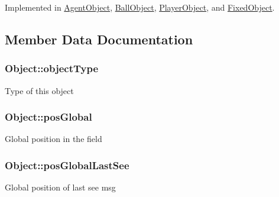 Implemented in \hyperlink{classAgentObject_a0043cea8d237828930412eb3c2b84e32}{Agent\+Object}, \hyperlink{classBallObject_a294d8fb34c88d98a1ef2ed2d1c864a62}{Ball\+Object}, \hyperlink{classPlayerObject_a01d587f88139dddf2ca1b39a65523dd6}{Player\+Object}, and \hyperlink{classFixedObject_ad8771b36cc2073d4a9fe1879b2f91d06}{Fixed\+Object}.



\subsection{Member Data Documentation}
\subsubsection[{\texorpdfstring{object\+Type}{objectType}}]{ Object\+::object\+Type\hspace{0.3cm}{\ttfamily [protected]}}\hypertarget{classObject_a1ecdca38441a375acbd102de3060b972}{}\label{classObject_a1ecdca38441a375acbd102de3060b972}
Type of this object 
\subsubsection[{\texorpdfstring{pos\+Global}{posGlobal}}]{ Object\+::pos\+Global\hspace{0.3cm}{\ttfamily [protected]}}\hypertarget{classObject_a7b1e09877ae916b49f64b9a9e9a3e0d1}{}\label{classObject_a7b1e09877ae916b49f64b9a9e9a3e0d1}
Global position in the field 
\subsubsection[{\texorpdfstring{pos\+Global\+Last\+See}{posGlobalLastSee}}]{ Object\+::pos\+Global\+Last\+See\hspace{0.3cm}{\ttfamily [protected]}}\hypertarget{classObject_a49148cd616efbb888175bfa825dcd167}{}\label{classObject_a49148cd616efbb888175bfa825dcd167}
Global position of last see msg 
